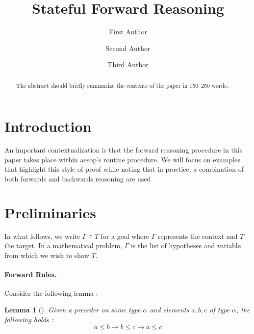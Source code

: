\documentclass[runningheads]{llncs}
\newtheorem{lem}{Lemma}
\newcommand{\xcom}[1]{{\color{cyan}{Xavier: #1}} }
\begin{document}
%
\title{Stateful Forward Reasoning}
%
%
\author{First Author \and
Second Author \and
Third Author}
%
%
%
\maketitle              %
%
\begin{abstract}
The abstract should briefly summarize the contents of the paper in
150--250 words.

\end{abstract}
%
%
%

\section{Introduction}
\xcom{TODO}

\xcom{ Specify the problem (user defined rules)
 + deal with changes with local context}
\xcom{ Talk about aesop}
\xcom{ Do we outline the solution?}

An important contextualization is that the forward reasoning procedure in this paper takes place
within aesop's routine procedure. We will focus on examples that highlight this style of proof
while noting that in practice, a combination of both forwards and backwards reasoning are used 
\section{Preliminaries}

\xcom{Adapt for CADE.}

In what follows, we write $\Gamma \models T$ for a goal where $\Gamma$ represents the context and
$T$ the target. In a mathematical problem, $\Gamma$ is the list of hypotheses and variable from
which we wish to show $T$.

\paragraph{Forward Rules.}
Consider the following lemma :
\begin{lem}[]
  Given a preorder on some type $\alpha$ and elements $a,b,c$ of type $\alpha$, the following holds :
  $$a \leq b \rightarrow b \leq c \rightarrow a \leq c$$
\end{lem}
\end{document}
